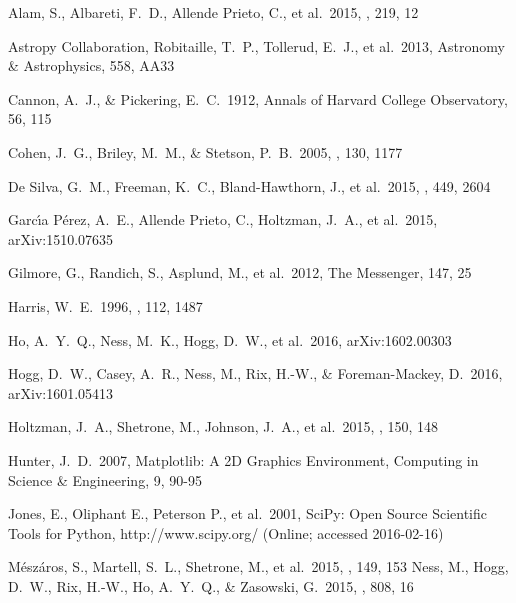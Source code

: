 \documentclass[12pt,preprint]{aastex}
\begin{document}
\begin{thebibliography}{dummy}\raggedright

 Alam, S., Albareti, F.~D., 
Allende Prieto, C., et al.\ 2015, \apjs, 219, 12 

 Astropy Collaboration, Robitaille, T.~P., Tollerud, E.~J., et al.\ 2013, Astronomy \& Astrophysics, 558, AA33 

 Cannon, A.~J., \& Pickering, E.~C.\ 1912, Annals of Harvard College Observatory, 56, 115 

 Cohen, J.~G., Briley, 
M.~M., \& Stetson, P.~B.\ 2005, \aj, 130, 1177 

 De Silva, G.~M., 
Freeman, K.~C., Bland-Hawthorn, J., et al.\ 2015, \mnras, 449, 2604 

Garc{\'{\i}}a P{\'e}rez, A.~E., Allende Prieto, C., Holtzman, J.~A., et 
al.\ 2015, arXiv:1510.07635 

 Gilmore, G., Randich, 
S., Asplund, M., et al.\ 2012, The Messenger, 147, 25 

 Harris, W.~E.\ 1996, \aj, 112, 
1487 

 Ho, A.~Y.~Q., Ness, M.~K., 
Hogg, D.~W., et al.\ 2016, arXiv:1602.00303 

 Hogg, D.~W., Casey, A.~R., 
Ness, M., Rix, H.-W., \& Foreman-Mackey, D.\ 2016, arXiv:1601.05413 

 Holtzman, J.~A., 
Shetrone, M., Johnson, J.~A., et al.\ 2015, \aj, 150, 148 

 Hunter, J.~D.\ 2007, Matplotlib: A 2D Graphics Environment, Computing in Science \& Engineering, 9, 90-95

 Jones, E., Oliphant E., Peterson P., et al.\ 2001, SciPy: Open Source Scientific Tools for Python, http://www.scipy.org/ (Online; accessed 2016-02-16)

M{\'e}sz{\'a}ros, S., Martell, S.~L., Shetrone, M., et al.\ 2015, \aj, 149, 
153 
 Ness, M., Hogg, D.~W., 
Rix, H.-W., Ho, A.~Y.~Q., \& Zasowski, G.\ 2015, \apj, 808, 16


\end{thebibliography}
\end{document}
